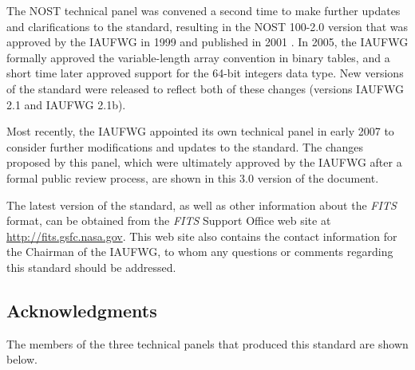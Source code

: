 \documentclass[onecolumn]{aa}
\begin{document}
The NOST technical panel was convened a second time to make further updates
and clarifications
to the standard, resulting in the NOST 100-2.0 version that was approved by 
the IAUFWG in 1999 and published in 2001 \citep{hanisch01}.  In 2005, 
the IAUFWG formally approved the variable-length
array convention in binary tables, and a short time later approved support for the 
64-bit integers data type.  New versions of the standard were released to
reflect both of these changes (versions IAUFWG 2.1 and IAUFWG 2.1b).

Most recently, the IAUFWG  appointed
its own technical panel in early 2007 to consider further modifications and updates
to the standard.  The changes proposed by this panel, which were ultimately approved
by the IAUFWG after a formal public review process, are shown in this 
3.0 version of the document.

The latest version of the standard, as well as other information about
the {\em FITS\/} format, can be obtained from the {\em FITS\/} Support
Office web site at \url{http://fits.gsfc.nasa.gov}.  This web site also 
contains the contact information for the Chairman of the IAUFWG, to whom 
any questions or comments regarding this standard should be addressed.

\subsection{Acknowledgments}


The members of the three technical panels that produced this standard are shown below.  
\end{document}
